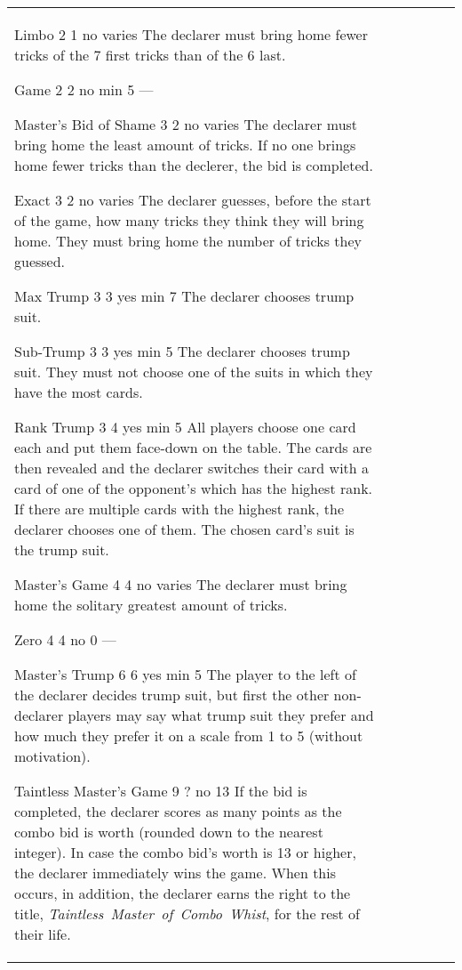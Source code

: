 \begin{table}
\begin{center}
\begin{tabularx}{\textwidth}{
			l
			S[table-number-alignment=center, table-format=1.0]
			S[table-number-alignment=center, table-format=1.0]
			cc|X
		}
				\standardBidItem%
				{Limbo}
				{2}
				{1}
				{no}
				{varies}
				{%
					The declarer must bring home fewer tricks of the 7 first tricks than of the 6 last.
				}
				
				\standardBidItem%
				{Game}
				{2}
				{2}
				{no}
				{min 5}
				{%
					---
				}

				\standardBidItem%
				{Master's Bid of Shame}
				{3}
				{2}
				{no}
				{varies}
				{%
					The declarer must bring home the least amount of tricks. If no one brings home fewer tricks than the declerer, the bid is completed.
				}

				\standardBidItem%
				{Exact}
				{3}
				{2}
				{no}
				{varies}
				{%
					The declarer guesses, before the start of the game, how many tricks they think they will bring home. They must bring home the number of tricks they guessed.
				}

				\standardBidItem%
				{Max Trump}
				{3}
				{3}
				{yes}
				{min 7}
				{%
					The declarer chooses trump suit.
				}

				\standardBidItem%
				{Sub-Trump}
				{3}
				{3}
				{yes}
				{min 5}
				{%
					The declarer chooses trump suit. They must not choose one of the suits in which they have the most cards.
				}

				\standardBidItem%
				{Rank Trump}
				{3}
				{4}
				{yes}
				{min 5}
				{%
					All players choose one card each and put them face-down on the table. The cards are then revealed and the declarer switches their card with a card of one of the opponent's which has the highest rank. If there are multiple cards with the highest rank, the declarer chooses one of them. The chosen card's suit is the trump suit.
				}

				\standardBidItem%
				{Master's Game}
				{4}
				{4}
				{no}
				{varies}
				{%
					The declarer must bring home the solitary greatest amount of tricks.
				}

				\standardBidItem%
				{Zero}
				{4}
				{4}
				{no}
				{0}
				{%
					---
				}

				\standardBidItem%
				{Master's Trump}
				{6}
				{6}
				{yes}
				{min 5}
				{%
					The player to the left of the declarer decides trump suit, but first the other non-declarer players may say what trump suit they prefer and how much they prefer it on a scale from 1 to 5 (without motivation).
				}

				\standardBidItem%
				{Taintless Master's Game}
				{9}
				{?}
				{no}
				{13}
				{%
					If the bid is completed, the declarer scores as many points as the combo bid is worth (rounded down to the nearest integer). In case the combo bid's worth is 13 or higher, the declarer immediately wins the game. When this occurs, in addition, the declarer earns the right to the title, \emph{Taintless~Master~of~Combo~Whist}, for the rest of their life.
				}
		\end{tabularx}
	\end{center}
\end{table}
